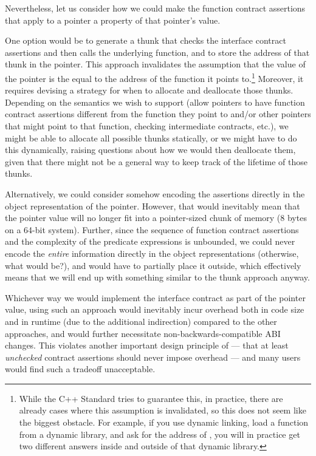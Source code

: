 Nevertheless, let us consider how we could make the function contract assertions that apply to a pointer a property of that pointer's value.

One option would be to generate a thunk that checks the interface contract assertions and then calls the underlying function, and to store the address of that thunk in the pointer. This approach  invalidates the assumption that the value of the pointer is the equal to the address of the function it points to.\footnote{While the C++ Standard tries to guarantee this, in practice, there are already cases where this assumption is invalidated, so this does not seem like the biggest obstacle. For example, if you use dynamic linking, load a function  from a dynamic library, and ask for the address of , you will in practice get two different answers inside and outside of that dynamic library.} Moreover, it requires devising a strategy for when to allocate and deallocate those thunks. Depending on the semantics we wish to support (allow pointers to have function contract assertions different from the function they point to and/or other pointers that might point to that function, checking intermediate contracts, etc.), we might be able to allocate all possible thunks statically, or we might have to do this dynamically, raising questions about how we would then deallocate them, given that there might not be a general way to keep track of the lifetime of those thunks.

Alternatively, we could consider somehow encoding the assertions directly in the object representation of the pointer. However, that would inevitably mean that the pointer value will no longer fit into a pointer-sized chunk of memory (8 bytes on a 64-bit system). Further, since the sequence of function contract assertions and the complexity of the predicate expressions is unbounded, we could never encode the \emph{entire} information directly in the object representations (otherwise, what would  be?), and would have to partially place it outside, which effectively means that we will end up with something similar to the thunk approach anyway.

Whichever way we would implement the interface contract as part of the pointer value, using such an approach would inevitably incur overhead both in code size and in runtime (due to the additional indirection) compared to the other approaches, and would further necessitate non-backwards-compatible ABI changes. This violates another important design principle of \cite{P2900R7} --- that at least \emph{unchecked} contract assertions should never impose overhead --- and many users would find such a tradeoff unacceptable.

